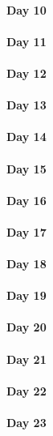 \documentclass[UTF8,a4paper,8pt]{ctexart}
\begin{document}
 	 \paragraph{Day 10      \quad     }
 	 \paragraph{Day 11      \quad     }
 	 \paragraph{Day 12      \quad     }
 	 \paragraph{Day 13      \quad     }
 	 \paragraph{Day 14      \quad     }
 	 \paragraph{Day 15      \quad     }
 	 \paragraph{Day 16      \quad     }
 	 \paragraph{Day 17      \quad     }
 	 \paragraph{Day 18      \quad     }
 	 \paragraph{Day 19      \quad     }
 	 \paragraph{Day 20      \quad     }
 	 \paragraph{Day 21      \quad     }
 	 \paragraph{Day 22      \quad     }
 	 \paragraph{Day 23      \quad     }
\end{document}
